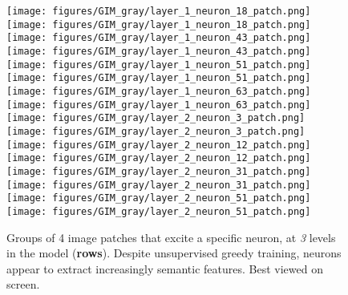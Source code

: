 \documentclass{article}
\begin{document}
\begin{figure}
        \texttt{[image: figures/GIM\_gray/layer\_1\_neuron\_18\_patch.png]}
        \hspace{-4pt}
        \texttt{[image: figures/GIM\_gray/layer\_1\_neuron\_18\_patch.png]}
        \hfill
        \texttt{[image: figures/GIM\_gray/layer\_1\_neuron\_43\_patch.png]}
        \hspace{-4pt}
        \texttt{[image: figures/GIM\_gray/layer\_1\_neuron\_43\_patch.png]}
        \hfill
        \texttt{[image: figures/GIM\_gray/layer\_1\_neuron\_51\_patch.png]}
        \hspace{-4pt}
        \texttt{[image: figures/GIM\_gray/layer\_1\_neuron\_51\_patch.png]}
        \hfill
        \texttt{[image: figures/GIM\_gray/layer\_1\_neuron\_63\_patch.png]}
        \hspace{-4pt}
        \texttt{[image: figures/GIM\_gray/layer\_1\_neuron\_63\_patch.png]}
\\
        \vspace{.5em}
\texttt{[image: figures/GIM\_gray/layer\_2\_neuron\_3\_patch.png]}
        \hspace{-4pt}
        \texttt{[image: figures/GIM\_gray/layer\_2\_neuron\_3\_patch.png]}
        \hfill
        \texttt{[image: figures/GIM\_gray/layer\_2\_neuron\_12\_patch.png]}
        \hspace{-4pt}
        \texttt{[image: figures/GIM\_gray/layer\_2\_neuron\_12\_patch.png]}
        \hfill
        \texttt{[image: figures/GIM\_gray/layer\_2\_neuron\_31\_patch.png]}
        \hspace{-4pt}
        \texttt{[image: figures/GIM\_gray/layer\_2\_neuron\_31\_patch.png]}
        \hfill
        \texttt{[image: figures/GIM\_gray/layer\_2\_neuron\_51\_patch.png]}
        \hspace{-4pt}
        \texttt{[image: figures/GIM\_gray/layer\_2\_neuron\_51\_patch.png]}
\caption{Groups of 4 image patches that excite a specific neuron, at \textit{3} levels in the model (\textbf{rows}). Despite unsupervised greedy training, neurons appear to extract increasingly semantic features. Best viewed on screen.}
    \label{fig:activate}
\end{figure} 
\end{document}
